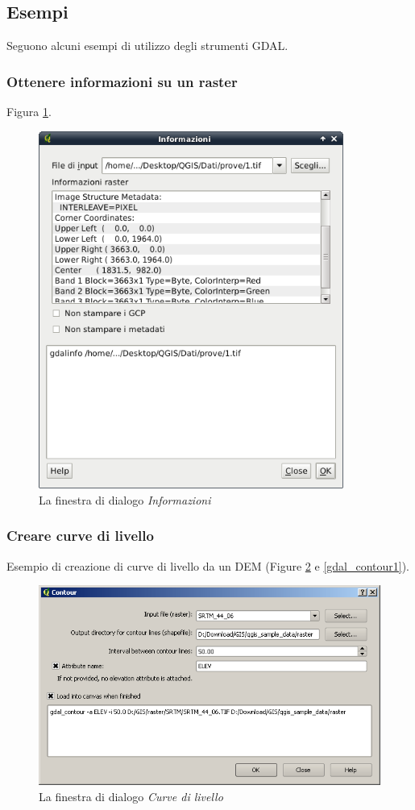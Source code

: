 {\subsection{Esempi}\label{gdal_examples}
Seguono alcuni esempi di utilizzo degli strumenti GDAL.
\subsubsection{Ottenere informazioni su un raster}

Figura \ref{gdalinfo}.

\begin{figure}[ht]
   \centering
   \caption{La finestra di dialogo \emph{Informazioni} \nixcaption}\label{gdalinfo}
   \includegraphics[clip=true, width=10cm]{plugins_gdaltools_images/gdalinfo}
\end{figure}

\subsubsection{Creare curve di livello}
Esempio di creazione di curve di livello da un DEM (Figure \ref{gdal_contour} e \ref{gdal_contour1}).
\begin{figure}[ht]
   \centering
   \caption{La finestra di dialogo \emph{Curve di livello} \nixcaption}\label{gdal_contour}
   \includegraphics[clip=true, width=12cm]{plugins_gdaltools_images/gdal_contour}
\end{figure}

}
